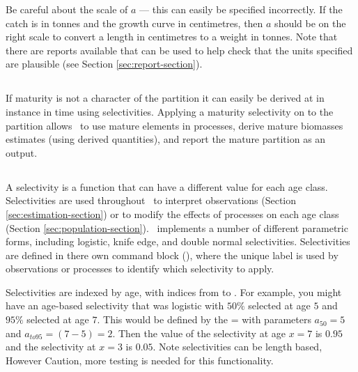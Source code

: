Be careful about the scale of $a$ --- this can easily be specified incorrectly. If the catch is in tonnes and the growth curve in centimetres, then $a$ should be on the right scale to convert a length in centimetres to a weight in tonnes. Note that there are reports available that can be used to help check that the units specified are plausible (see Section \ref{sec:report-section}).


\subsubsection*{}

\subsection{\label{sec:weightless-model}}

\subsection{\label{sec:maturity-notinpartition}}
If maturity is not a character of the partition it can easily be derived at in instance in time using selectivities. Applying a maturity selectivity on to the partition allows \CNAME\ to use mature elements in processes, derive mature biomasses estimates (using derived quantities), and report the mature partition as an output.

\subsection{\label{sec:selectivities}}

A selectivity is a function that can have a different value for each age class. Selectivities are used throughout \CNAME\ to interpret observations (Section \ref{sec:estimation-section}) or to modify the effects of processes on each age class (Section \ref{sec:population-section}). \CNAME\ implements a number of different parametric forms, including logistic, knife edge, and double normal selectivities. Selectivities are defined in there own command block (), where the unique label is used by observations or processes to identify which selectivity to apply.

Selectivities are indexed by age, with indices from  to . For example, you might have an age-based selectivity that was logistic with $50\%$ selected at age $5$ and $95\%$ selected at age $7$. This would be defined by the = with parameters $a_{50}=5$ and $a_{to95}=(7-5)=2$. Then the value of the selectivity at age $x=7$ is $0.95$ and the selectivity at $x=3$ is $0.05$. Note selectivities can be length based, However Caution, more testing is needed for this functionality.

